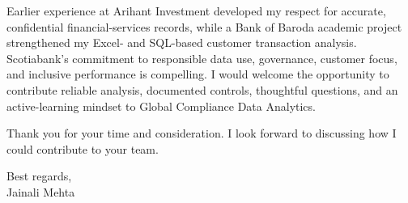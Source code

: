 \documentclass[letterpaper,11pt]{article}
\begin{document}
\bigbreak
Earlier experience at Arihant Investment developed my respect for accurate, confidential financial-services records, while a Bank of Baroda academic project strengthened my Excel- and SQL-based customer transaction analysis. Scotiabank's commitment to responsible data use, governance, customer focus, and inclusive performance is compelling. I would welcome the opportunity to contribute reliable analysis, documented controls, thoughtful questions, and an active-learning mindset to Global Compliance Data Analytics.

\bigbreak
Thank you for your time and consideration. I look forward to discussing how I could contribute to your team.

\bigbreak
Best regards,\\
Jainali Mehta
\end{document}
